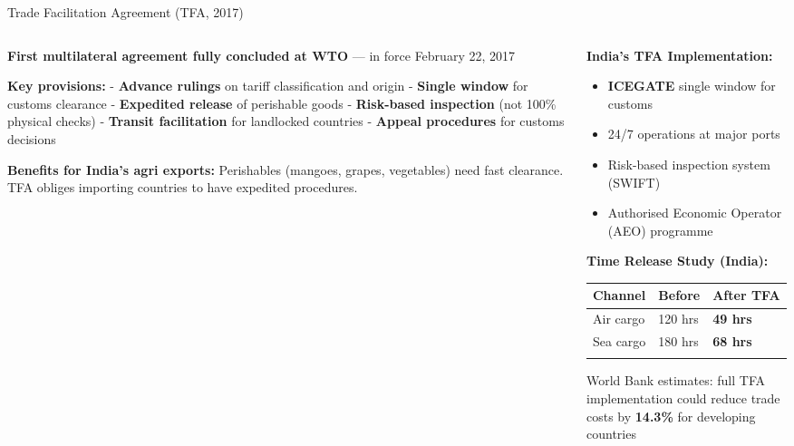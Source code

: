 \documentclass[
  ignorenonframetext,
  aspectratio=169,
]{beamer}
\makeatletter
\providecommand{\tightlist}{%
  \setlength{\itemsep}{0pt}\setlength{\parskip}{0pt}}
\let\quarto@originallabel\label
\DeclareRobustCommand*{\label}[1]{\quarto@originallabel{#1}}
\makeatother
\begin{document}
\begin{frame}{Trade Facilitation Agreement (TFA, 2017)}
\label{trade-facilitation-agreement-tfa-2017}
\begin{columns}[T]
\begin{column}{0.55\linewidth}
\textbf{First multilateral agreement fully concluded at WTO} --- in
force February 22, 2017

\textbf{Key provisions:} - \textbf{Advance rulings} on tariff
classification and origin - \textbf{Single window} for customs clearance
- \textbf{Expedited release} of perishable goods - \textbf{Risk-based
inspection} (not 100\% physical checks) - \textbf{Transit facilitation}
for landlocked countries - \textbf{Appeal procedures} for customs
decisions

\textbf{Benefits for India's agri exports:} Perishables (mangoes,
grapes, vegetables) need fast clearance. TFA obliges importing countries
to have expedited procedures.
\end{column}

\begin{column}{0.45\linewidth}
\textbf{India's TFA Implementation:}

\begin{itemize}
\tightlist
\item
  \textbf{ICEGATE} single window for customs
\item
  24/7 operations at major ports
\item
  Risk-based inspection system (SWIFT)
\item
  Authorised Economic Operator (AEO) programme
\end{itemize}

\textbf{Time Release Study (India):}

\begin{longtable}[]{@{}lll@{}}
\toprule\noalign{}
Channel & Before & After TFA \\
\midrule\noalign{}
\endhead
Air cargo & 120 hrs & \textbf{49 hrs} \\
Sea cargo & 180 hrs & \textbf{68 hrs} \\
\bottomrule\noalign{}
\end{longtable}

World Bank estimates: full TFA implementation could reduce trade costs
by \textbf{14.3\%} for developing countries
\end{column}
\end{columns}
\end{frame}
\end{document}
